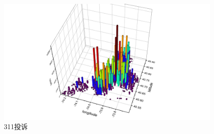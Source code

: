 \documentclass[a4paper, UTF8]{article}
\begin{document}
\begin{CJK}{UTF8}{gbsn}
\begin{figure}[ht]
{\begin{minipage}[t]{0.4\linewidth}
\centering
\includegraphics[scale = 0.2]{blocked.png}
\end{minipage}
}
\centering
\caption{311投诉}
\label{311}
\end{figure}

\end{CJK}
\end{document}
